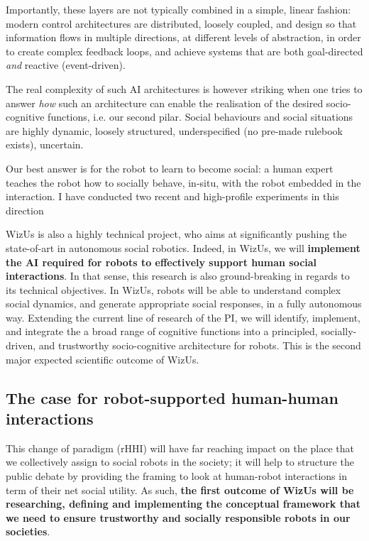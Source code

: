 \documentclass[11pt,a4paper]{report}
\newcommand{\project}{WizUs\xspace}
\begin{document}
Importantly, these layers are not typically combined in a simple, linear
fashion: modern control architectures are distributed, loosely coupled, and
design so that information flows in multiple directions, at different levels of
abstraction, in order to create complex feedback loops, and achieve systems that are
both goal-directed \emph{and} reactive (event-driven).


The real complexity of such AI architectures is however striking when one tries
to answer \emph{how} such an architecture can enable the realisation of the
desired socio-cognitive functions, i.e. our second pilar. Social behaviours and
social situations are highly dynamic, loosely structured, underspecified (no
pre-made rulebook exists), uncertain.

Our best answer is for the robot to learn to become social: a human expert teaches
the robot how to socially behave, in-situ, with the robot embedded in the
interaction. I have conducted two recent and high-profile experiments in this
direction







\project is also a highly technical project, who aims at significantly
pushing the state-of-art in autonomous social robotics. Indeed, in \project, we will
\textbf{implement the AI required for robots to effectively support
human social interactions}.  In that sense, this research is also
ground-breaking in regards to its technical objectives. In \project, robots will
be able to understand complex social dynamics, and generate appropriate social
responses, in a fully autonomous way.  Extending the current line of research of
the PI, we will identify, implement, and integrate the a broad range of cognitive functions into a
principled, socially-driven, and trustworthy socio-cognitive architecture for
robots. This is the second major expected scientific outcome of \project.

\subsection{The case for robot-supported human-human interactions}

This change of paradigm (rHHI) will have
far reaching impact on the place that we collectively assign to social robots in
the society; it will help to structure the public debate by providing the
framing to look at human-robot interactions in term of their net social utility.
As such, \textbf{the first outcome of \project will be researching, defining and implementing the conceptual
framework that we need to ensure trustworthy and socially responsible robots in
our societies}.
\end{document}
